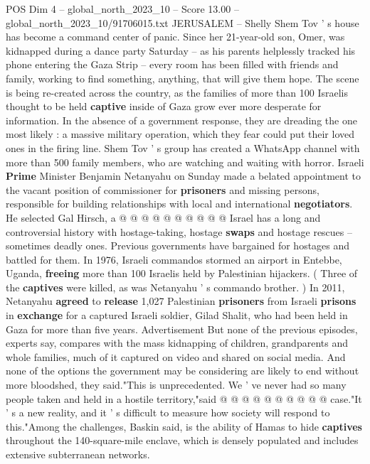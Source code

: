 \begin{textsample}{POS Dim 4 – global\_north\_2023\_10 – Score 13.00 – global\_north\_2023\_10/91706015.txt}  \label{ex:f4_pos_444}
JERUSALEM -- Shelly Shem Tov ' s house has become a command center of panic.
Since her 21-year-old son, Omer, was kidnapped during a dance party Saturday -- as his parents helplessly tracked his phone entering the Gaza Strip -- every room has been filled with friends and family, working to find something, anything, that will give them hope.
The scene is being re-created across the country, as the families of more than 100 Israelis thought to be held \textbf{captive} inside of Gaza grow ever more desperate for information.
In the absence of a government response, they are dreading the one most likely : a massive military operation, which they fear could put their loved ones in the firing line.
Shem Tov ' s group has created a WhatsApp channel with more than 500 family members, who are watching and waiting with horror.
Israeli \textbf{Prime} Minister Benjamin Netanyahu on Sunday made a belated appointment to the vacant position of commissioner for \textbf{prisoners} and missing persons, responsible for building relationships with local and international \textbf{negotiators}.
He selected Gal Hirsch, a @ @ @ @ @ @ @ @ @ @ Israel has a long and controversial history with hostage-taking, hostage \textbf{swaps} and hostage rescues -- sometimes deadly ones.
Previous governments have bargained for hostages and battled for them.
In 1976, Israeli commandos stormed an airport in Entebbe, Uganda, \textbf{freeing} more than 100 Israelis held by Palestinian hijackers. ( Three of the \textbf{captives} were killed, as was Netanyahu ' s commando brother. ) In 2011, Netanyahu \textbf{agreed} to \textbf{release} 1,027 Palestinian \textbf{prisoners} from Israeli \textbf{prisons} in \textbf{exchange} for a captured Israeli soldier, Gilad Shalit, who had been held in Gaza for more than five years.
Advertisement But none of the previous episodes, experts say, compares with the mass kidnapping of children, grandparents and whole families, much of it captured on video and shared on social media.
And none of the options the government may be considering are likely to end without more bloodshed, they said."This is unprecedented.
We ' ve never had so many people taken and held in a hostile territory,"said @ @ @ @ @ @ @ @ @ @ case."It ' s a new reality, and it ' s difficult to measure how society will respond to this."Among the challenges, Baskin said, is the ability of Hamas to hide \textbf{captives} throughout the 140-square-mile enclave, which is densely populated and includes extensive subterranean networks.

\end{textsample}
